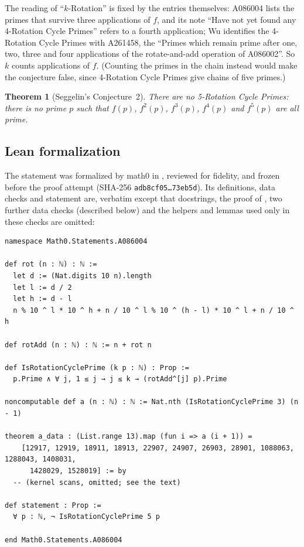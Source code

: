 \documentclass[11pt]{amsart}
\theoremstyle{plain}
\newtheorem{theorem}{Theorem}
\theoremstyle{definition}
\begin{document}
The reading of ``$k$-Rotation'' is fixed by the entries themselves: A086004 lists the primes that survive three applications of $f$, and its note ``Have not yet found any 4-Rotation Cycle Primes'' refers to a fourth application; Wu identifies the 4-Rotation Cycle Primes with A261458, the ``Primes which remain prime after one, two, three and four applications of the rotate-and-add operation of A086002''. So $k$ counts applications of $f$. (Counting the primes in the chain instead would make the conjecture false, since 4-Rotation Cycle Primes give chains of five primes.)

\begin{theorem}[Seggelin's Conjecture~2]\label{thm:main}
There are no 5-Rotation Cycle Primes: there is no prime $p$ such that $f(p)$, $f^2(p)$, $f^3(p)$, $f^4(p)$ and $f^5(p)$ are all prime.
\end{theorem}

\subsection*{Lean formalization}
The statement was formalized by math0 in , reviewed for fidelity, and frozen before the proof attempt (SHA-256 \texttt{adb8cf05\dots73eb5d}). Its definitions, data checks and statement are, verbatim except that docstrings, the proof of , two further data checks (described below) and the helpers and lemmas used only in these checks are omitted:
\begin{lstlisting}
namespace Math0.Statements.A086004

def rot (n : ℕ) : ℕ :=
  let d := (Nat.digits 10 n).length
  let l := d / 2
  let h := d - l
  n % 10 ^ l * 10 ^ h + n / 10 ^ l % 10 ^ (h - l) * 10 ^ l + n / 10 ^ h

def rotAdd (n : ℕ) : ℕ := n + rot n

def IsRotationCyclePrime (k p : ℕ) : Prop :=
  p.Prime ∧ ∀ j, 1 ≤ j → j ≤ k → (rotAdd^[j] p).Prime

noncomputable def a (n : ℕ) : ℕ := Nat.nth (IsRotationCyclePrime 3) (n - 1)

theorem a_data : (List.range 13).map (fun i => a (i + 1)) =
    [12917, 12919, 18911, 18913, 22907, 24907, 26903, 28901, 1088063, 1288043, 1408031,
      1428029, 1528019] := by
  -- (kernel scans, omitted; see the text)

def statement : Prop :=
  ∀ p : ℕ, ¬ IsRotationCyclePrime 5 p

end Math0.Statements.A086004
\end{lstlisting}
\end{document}
